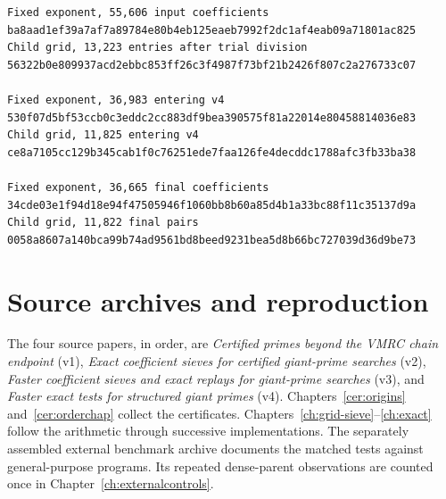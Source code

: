 \documentclass[11pt,a4paper,oneside,openany]{report}
\begin{document}
{\small\begin{verbatim}
Fixed exponent, 55,606 input coefficients
ba8aad1ef39a7af7a89784e80b4eb125eaeb7992f2dc1af4eab09a71801ac825
Child grid, 13,223 entries after trial division
56322b0e809937acd2ebbc853ff26c3f4987f73bf21b2426f807c2a276733c07

Fixed exponent, 36,983 entering v4
530f07d5bf53ccb0c3eddc2cc883df9bea390575f81a22014e80458814036e83
Child grid, 11,825 entering v4
ce8a7105cc129b345cab1f0c76251ede7faa126fe4decddc1788afc3fb33ba38

Fixed exponent, 36,665 final coefficients
34cde03e1f94d18e94f47505946f1060bb8b60a85d4b1a33bc88f11c35137d9a
Child grid, 11,822 final pairs
0058a8607a140bca99b74ad9561bd8beed9231bea5d8b66bc727039d36d9be73
\end{verbatim}
}

\section{Source archives and reproduction}
The four source papers, in order, are \emph{Certified primes beyond the VMRC chain endpoint} (v1), \emph{Exact coefficient sieves for certified giant-prime searches} (v2), \emph{Faster coefficient sieves and exact replays for giant-prime searches} (v3), and \emph{Faster exact tests for structured giant primes} (v4). Chapters~\ref{cer:origins} and~\ref{cer:orderchap} collect the certificates. Chapters~\ref{ch:grid-sieve}--\ref{ch:exact} follow the arithmetic through successive implementations. The separately assembled external benchmark archive documents the matched tests against general-purpose programs. Its repeated dense-parent observations are counted once in Chapter~\ref{ch:externalcontrols}.
\end{document}
